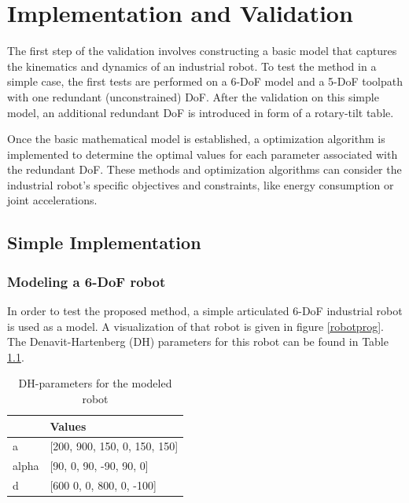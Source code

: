 \chapter{Implementation and Validation}%

The first step of the validation involves constructing a basic model that captures the kinematics and dynamics of an industrial robot. To test the method in a simple case, the first tests are performed on a 6-DoF model and a  5-DoF toolpath with one redundant (unconstrained) DoF. After the validation on this simple model, an additional redundant DoF is introduced in form of a rotary-tilt table. 

Once the basic mathematical model is established, a optimization algorithm is implemented to determine the optimal values for each parameter associated with the redundant DoF. These methods and optimization algorithms can consider the industrial robot's specific objectives and constraints, like energy consumption or joint accelerations. 



\section{Simple Implementation}%
\subsection{Modeling a 6-DoF robot}
In order to test the proposed method, a simple articulated 6-DoF industrial robot is used as a model. A visualization of that robot is given in figure \ref{robotprog}. The Denavit-Hartenberg (DH) parameters for this robot can be found in Table \ref{DH}.

\begin{table}[H]
	\centering
	\begin{tabular}{||l|l||}
		  & Values \\
		\hline
		\hline
		\hline
		a	&		[200, 900, 150, 0,   150, 150] \\
		alpha	&  	[90,  0,   90,  -90, 90,  0] \\
		d	& 		[600  0,   0,   800, 0,   -100]\\
		
		\hline
		\hline
	\end{tabular}
	
	\caption{DH-parameters for the modeled robot}
	\label{DH}
\end{table}

